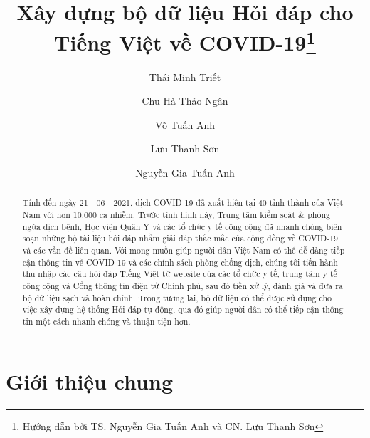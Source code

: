 \documentclass[runningheads]{llncs}
\begin{document}
%
\title{Xây dựng bộ dữ liệu Hỏi đáp cho Tiếng Việt về COVID-19\thanks{Hướng dẫn bởi TS. Nguyễn Gia Tuấn Anh và CN. Lưu Thanh Sơn}}
%
%
\author{Thái Minh Triết \and
Chu Hà Thảo Ngân \and
Võ Tuấn Anh \and
Lưu Thanh Sơn \and
Nguyễn Gia Tuấn Anh 
}
%
%

%
\maketitle              %
%
\begin{abstract}
Tính đến ngày 21 - 06 - 2021, dịch COVID-19 đã xuất hiện tại 40 tỉnh thành của Việt Nam với hơn 10.000 ca nhiễm. Trước tình hình này, Trung tâm kiểm soát \& phòng ngừa dịch bệnh, Học viện Quân Y và các tổ chức y tế công cộng đã nhanh chóng biên soạn những bộ tài liệu hỏi đáp nhằm giải đáp thắc mắc của cộng đồng về COVID-19 và các vấn đề liên quan.
Với mong muốn giúp người dân Việt Nam có thể dễ dàng tiếp cận thông tin về COVID-19 và các chính sách phòng chống dịch, chúng tôi tiến hành thu nhập các câu hỏi đáp Tiếng Việt từ website của các tổ chức y tế, trung tâm y tế công cộng và Cổng thông tin điện tử Chính phủ, sau đó tiền xử lý, đánh giá và đưa ra bộ dữ liệu sạch và hoàn chỉnh. Trong tương lai, bộ dữ liệu có thể được sử dụng cho việc xây dựng hệ thống Hỏi đáp tự động, qua đó giúp người dân có thể tiếp cận thông tin một cách nhanh chóng và thuận tiện hơn.


\end{abstract}
%
%
%
\section{Giới thiệu chung}
\end{document}
